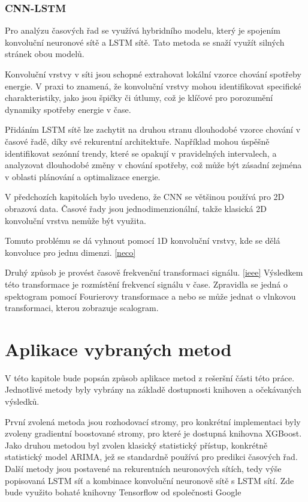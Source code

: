 \documentclass[FM,BP,fonts]{tulthesis}
\begin{document}
\subsection{CNN-LSTM}\label{cnn-lstm-teorie}
Pro analýzu časových řad se využívá hybridního modelu, který je spojením konvoluční neuronové sítě a LSTM sítě. Tato metoda se snaží využít silných stránek obou modelů. 

Konvoluční vrstvy v síti jsou schopné extrahovat lokální vzorce chování spotřeby energie. V praxi to znamená, že konvoluční vrstvy mohou identifikovat specifické charakteristiky, jako jsou špičky či útlumy, což je klíčové pro porozumění dynamiky spotřeby energie v čase. 

Přidáním LSTM sítě lze zachytit na druhou stranu dlouhodobé vzorce chování v časové řadě, díky své rekurentní architektuře.
 Například mohou úspěšně identifikovat sezónní trendy, které se opakují v pravidelných intervalech, a analyzovat dlouhodobé změny v chování spotřeby, což může být zásadní zejména v oblasti plánování a optimalizace energie. 

V předchozích kapitolách bylo uvedeno, že CNN se většinou používá pro 2D obrazová data. Časové řady jsou  jednodimenzionální, takže klasická 2D konvoluční vrstva nemůže být využita.

Tomuto problému se dá vyhnout pomocí 1D konvoluční vrstvy, kde se dělá konvoluce pro jednu dimenzi. \ref{neco}

Druhý způsob je provést časově frekvenční transformaci signálu. \ref{ieee} Výsledkem této transformace je rozmístění frekvencí signálu v čase. Zpravidla se jedná o spektogram pomocí Fourierovy transformace a nebo se může jednat o vlnkovou transformaci, kterou zobrazuje scalogram.


\chapter{Aplikace vybraných metod}
V této kapitole bude popsán způsob aplikace metod z rešeršní části této práce. Jednotlivé metody byly vybrány na základě dostupnosti knihoven a očekávaných výsledků.

První zvolená metoda jsou rozhodovací stromy, pro konkrétní implementaci byly zvoleny gradientní boostované stromy, pro které je dostupná knihovna XGBoost. Jako druhou metodou byl zvolen klasický statistický přístup, konkrétně statistický model ARIMA, jež se standardně používá pro predikci časových řad. Další metody jsou postavené na rekurentních neuronových sítích, tedy výše popisovaná LSTM síť a kombinace konvoluční neuronově sítě s LSTM sítí. Zde bude využito bohaté knihovny Tensorflow od společnosti Google
\end{document}
